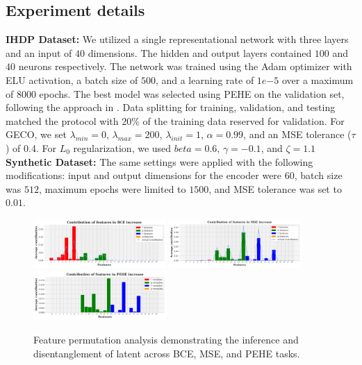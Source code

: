 \documentclass[doubleblind]{ecai}
\begin{document}
	\subsection{Experiment details}
	\textbf{IHDP Dataset:}
	We utilized a single representational network with three layers and an input of $40$ dimensions. The hidden and output layers contained $100$ and $40$ neurons respectively. The network was trained using the Adam optimizer with ELU activation, a batch size of $500$, and a learning rate of $1{e}{-5}$ over a maximum of $8000$ epochs. The best model was selected using PEHE on the validation set, following the approach in \citet{UriSha}. Data splitting for training, validation, and testing matched the protocol with $20$\% of the training data reserved for validation. For GECO, we set $\lambda_{min}=0$, 
	$\lambda_{max}=200$, $\lambda_{init}=1$, $\alpha=0.99$, and an MSE tolerance ($\tau$) of 0.4. For $L_0$ regularization, we used $beta=0.6$, $\gamma=-0.1$, and $\zeta=1.1$
	\textbf{Synthetic Dataset:}
	The same settings were applied with the following modifications: input and output dimensions for the encoder were $60$, batch size was $512$, maximum epochs were limited to $1500$, and MSE tolerance was set to $0.01$.
	
	
	
	\begin{figure}
		\centering
		
		\includegraphics[width=0.45\textwidth]{Images/bce_increase_new_2.png}
		\includegraphics[width=0.45\textwidth]{Images/mse_increase_new_2.png}
		\includegraphics[width=0.45\textwidth]{Images/pehe_increase_new_2.png}
		
		
		\caption{Feature permutation analysis demonstrating the inference and disentanglement of latent across BCE, MSE, and PEHE tasks.}
		
		\label{fig:permutation}
		
	\end{figure}
	
\end{document}
